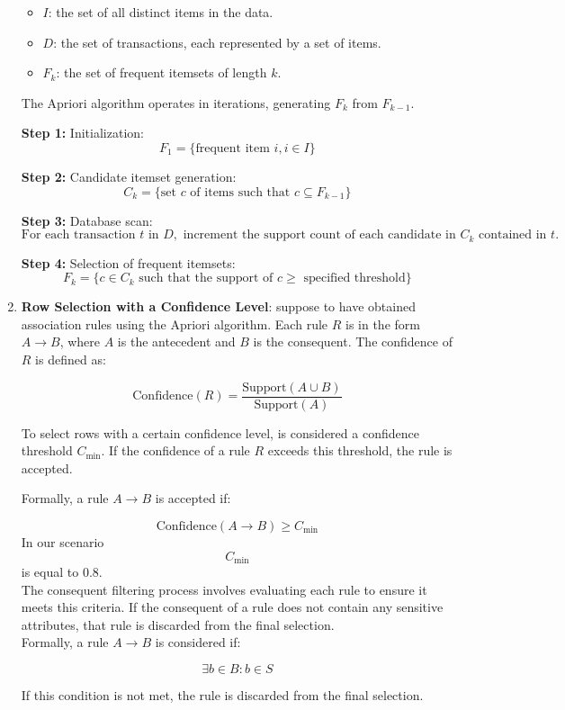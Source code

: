 \documentclass[12pt,a4paper,openright,twoside]{book}
\begin{document}
\begin{enumerate}
\begin{itemize}
  \item $I$: the set of all distinct items in the data.
  \item $D$: the set of transactions, each represented by a set of items.
  \item $F_k$: the set of frequent itemsets of length $k$.
\end{itemize}

The Apriori algorithm operates in iterations, generating $F_k$ from $F_{k-1}$.

\textbf{Step 1:} Initialization:
$$F_1 = \{ \text{frequent item } i, i \in I \}$$

\textbf{Step 2:} Candidate itemset generation:
$$C_k = \{ \text{set } c \text{ of items such that } c \subseteq F_{k-1} \}$$

\textbf{Step 3:} Database scan:
$$\text{For each transaction } t \text{ in } D, \text{ increment the support count of each candidate in } C_k \text{ contained in } t.$$

\textbf{Step 4:} Selection of frequent itemsets:
$$F_k = \{ c \in C_k \text{ such that the support of } c \geq \text{ specified threshold} \}$$

\item \textbf{Row Selection with a Confidence Level}: 
suppose to have obtained association rules using the Apriori algorithm. Each rule $R$ is in the form $A \rightarrow B$, where $A$ is the antecedent and $B$ is the consequent. The confidence of $R$ is defined as:

\[
\text{Confidence}(R) = \frac{\text{Support}(A \cup B)}{\text{Support}(A)}
\]

To select rows with a certain confidence level, is considered a confidence threshold $C_{\text{min}}$. If the confidence of a rule $R$ exceeds this threshold, the rule is accepted.

Formally, a rule $A \rightarrow B$ is accepted if:

\[
\text{Confidence}(A \rightarrow B) \geq C_{\text{min}}
\]
In our scenario
\[
C_{\text{min}}
\]
is equal to 0.8. \\

The consequent filtering process involves evaluating each rule to ensure it meets this criteria. If the consequent of a rule does not contain any sensitive attributes, that rule is discarded from the final selection. \\

Formally, a rule $A \rightarrow B$ is considered if:

\[
\exists b \in B : b \in S
\]

If this condition is not met, the rule is discarded from the final selection.
\end{enumerate}
\end{document}
